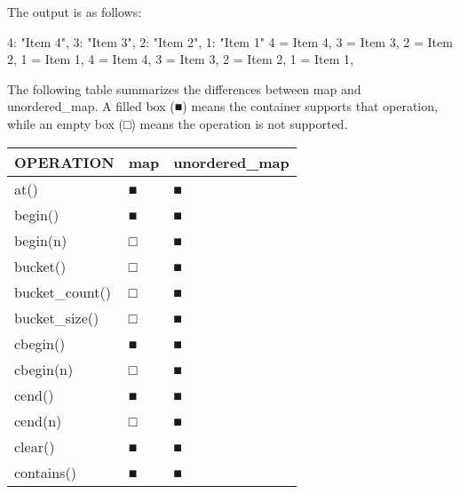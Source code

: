 The output is as follows:

\begin{shell}
{4: "Item 4", 3: "Item 3", 2: "Item 2", 1: "Item 1"}
4 = Item 4, 3 = Item 3, 2 = Item 2, 1 = Item 1,
4 = Item 4, 3 = Item 3, 2 = Item 2, 1 = Item 1,
\end{shell}

The following table summarizes the differences between map and unordered\_map. A filled box (■) means the container supports that operation, while an empty box (□) means the operation is not supported.

\begin{longtable}{|l|l|l|}
\hline
\textbf{OPERATION}                           & \textbf{map} & \textbf{unordered\_map} \\ \hline
\endfirsthead
%
\endhead
%
at()                                         & ■            & ■                       \\ \hline
begin()                                      & ■            & ■                       \\ \hline
begin(n)                                     & □            & ■                       \\ \hline
bucket()                                     & □            & ■                       \\ \hline
bucket\_count()                              & □            & ■                       \\ \hline
bucket\_size()                               & □            & ■                       \\ \hline
cbegin()                                     & ■            & ■                       \\ \hline
cbegin(n)                                    & □            & ■                       \\ \hline
cend()                                       & ■            & ■                       \\ \hline
cend(n)                                      & □            & ■                       \\ \hline
clear()                                      & ■            & ■                       \\ \hline
contains()                                   & ■            & ■                       \\ \hline

\end{longtable}
